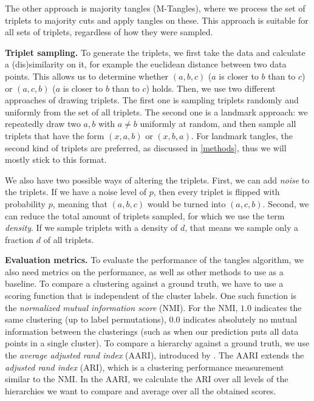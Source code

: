 The other approach is majority tangles (M-Tangles), where we process the set of triplets to majority cuts and apply tangles on these. This approach is suitable for all sets of triplets,
regardless of how they were sampled.

\textbf{Triplet sampling.}
To generate the triplets, we first take the data and calculate a (dis)similarity on it, for example the euclidean distance between two data points. This allows
us to determine whether $(a,b,c)$ ($a$ is closer to $b$ than to $c$) or $(a,c,b)$ ($a$ is closer to $b$ than to $c$) holds.
Then, we use two different approaches of drawing triplets. The first one is sampling triplets randomly and uniformly from the set of all triplets. The second one is a landmark approach:
we repeatedly draw two $a,b$ with $a \neq b$ uniformly at random, and then sample all triplets that have the form $(x,a,b)$ or $(x,b,a)$. 
For landmark tangles, the second kind of triplets are preferred, as discussed in \autoref{methods}, thus we will mostly stick to this format. 

We also have two possible ways of altering the triplets. First, we can add \textit{noise}
to the triplets. If we have a noise level of $p$, then every triplet is flipped with probability $p$, meaning that $(a,b,c)$ would be turned into $(a,c,b)$. 
Second, we can reduce the total amount of triplets sampled, for which we use the term \textit{density}. 
If we sample triplets with a density of $d$, that means we sample only a fraction $d$ of all triplets. 

\noindent
\textbf{Evaluation metrics.}
To evaluate the performance of the tangles algorithm, we also need metrics on the performance, as well as other methods to use as a baseline. 
To compare a clustering against a ground truth, we have to use a scoring function that is independent of the cluster labels. 
One such function is the \textit{normalized mutual information score} (NMI). 
For the NMI, $1.0$ indicates the same clustering (up to label permutations), $0.0$ indicates absolutely no mutual information between the clusterings (such as when our prediction
puts all data points in a single cluster). To compare a hierarchy against a ground truth, we use the \textit{average adjusted rand index} (AARI), 
introduced by \cite{ghoshdastidarFoundationsComparisonBasedHierarchical2019}. The AARI extends the \textit{adjusted rand index} (ARI), which is a clustering performance measurement
similar to the NMI. In the AARI, we calculate the ARI over all levels of the hierarchies we want to compare and average over all the obtained scores. 
\\

